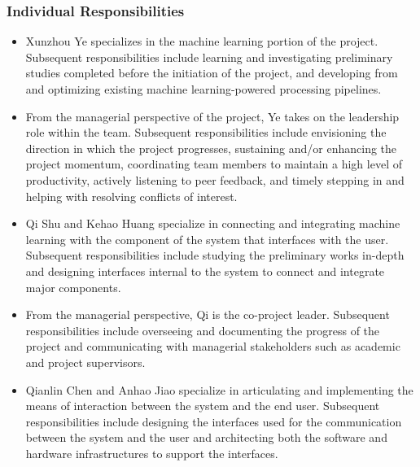 \documentclass[12pt]{article}
\begin{document}
\subsubsection{Individual Responsibilities}
\begin{itemize}
    \item Xunzhou Ye specializes in the machine learning portion of the project. Subsequent responsibilities include learning and investigating preliminary studies completed before the initiation of the project, and developing from and optimizing existing machine learning-powered processing pipelines. 
    \item From the managerial perspective of the project, Ye takes on the leadership role within the team. Subsequent responsibilities include envisioning the direction in which the project progresses, sustaining and/or enhancing the project momentum, coordinating team members to maintain a high level of productivity, actively listening to peer feedback, and timely stepping in and helping with resolving conflicts of interest.
    \item Qi Shu and Kehao Huang specialize in connecting and integrating machine learning with the component of the system that interfaces with the user. Subsequent responsibilities include studying the preliminary works in-depth and designing interfaces internal to the system to connect and integrate major components.
    \item From the managerial perspective, Qi is the co-project leader. Subsequent responsibilities include overseeing and documenting the progress of the project and communicating with managerial stakeholders such as academic and project supervisors.
    \item Qianlin Chen and Anhao Jiao specialize in articulating and implementing the means of interaction between the system and the end user. Subsequent responsibilities include designing the interfaces used for the communication between the system and the user and architecting both the software and hardware infrastructures to support the interfaces. 
\end{itemize}
\end{document}
